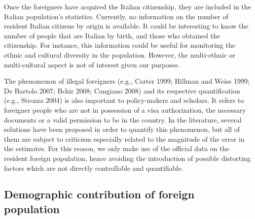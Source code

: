 \documentclass[10pt] {article}
\theoremstyle{definition}
\theoremstyle{plain}
\begin{document}
Once the foreigners have acquired the Italian citizenship, they are included in the Italian population's statistics. Currently, no information on the number of resident Italian citizens by origin is available. It could be interesting to know the number of people that are Italian by birth, and those who obtained the citizenship. For instance, this information could be useful for monitoring the ethnic and cultural diversity in the population. However, the multi-ethnic or multi-cultural aspect is not of interest given our purposes. %

The phenomenon of illegal foreigners (e.g., Carter 1999; Hillman and Weiss 1999; De Bartolo 2007; Bchir 2008; Cangiano 2008) and its respective quantification (e.g., Strozza 2004) is also important to policy-makers and scholars. It refers to foreigner people who are not in possession of a visa authorization, the necessary documents or a valid permission to be in the country. In the literature, several solutions have been proposed in order to quantify this phenomenon, but all of them are subject to criticism especially related to the magnitude of the error in the estimates. For this reason, we only make use of the official data on the resident foreign population, hence avoiding the introduction of possible distorting factors which are not directly controllable and quantifiable. %


\subsection{Demographic contribution of foreign population \label{DEM}}
\end{document}

